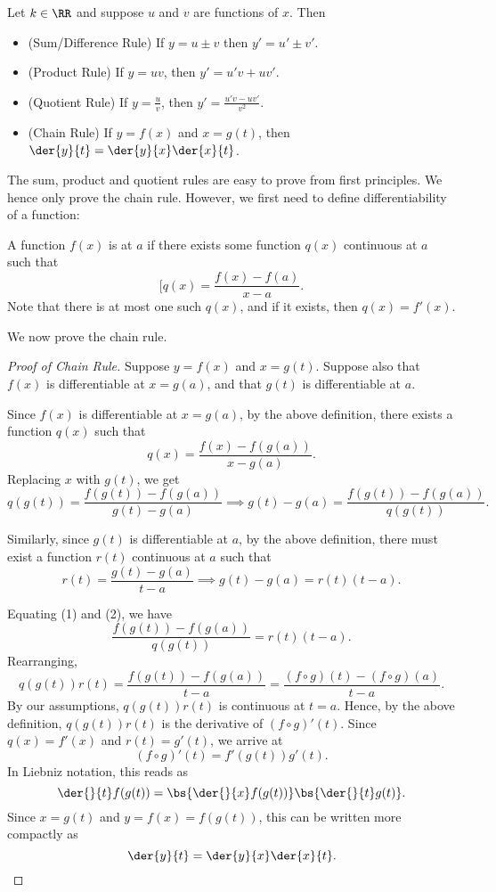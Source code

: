 \begin{proposition}
    Let $k \in \RR$ and suppose $u$ and $v$ are functions of $x$. Then
    \begin{itemize}
        \item (Sum/Difference Rule) If $y = u \pm v$ then $y' = u' \pm v'$.
        \item (Product Rule) If $y = uv$, then $y' = u' v + u v'$.
        \item (Quotient Rule) If $y = \frac{u}{v}$, then $y' = \frac{u' v - u v'}{v^2}$.
        \item (Chain Rule) If $y = f(x)$ and $x = g(t)$, then $\der{y}{t} = \der{y}{x} \der{x}{t}$.
    \end{itemize}
\end{proposition}
The sum, product and quotient rules are easy to prove from first principles. We hence only prove the chain rule. However, we first need to define differentiability of a function:
\begin{definition}\label{def:Differentiability}
    A function $f(x)$ is  at $a$ if there exists some function $q(x)$ continuous at $a$ such that \[[q(x) = \frac{f(x) - f(a)}{x - a}.\] Note that there is at most one such $q(x)$, and if it exists, then $q(x) = f'(x)$.
\end{definition}
We now prove the chain rule.
\begin{proof}[Proof of Chain Rule]    
    Suppose $y = f(x)$ and $x = g(t)$. Suppose also that $f(x)$ is differentiable at $x = g(a)$, and that $g(t)$ is differentiable at $a$.

    Since $f(x)$ is differentiable at $x = g(a)$, by the above definition, there exists a function $q(x)$ such that \[q(x) = \frac{f(x) - f(g(a))}{x - g(a)}.\] Replacing $x$ with $g(t)$, we get \[q(g(t)) = \frac{f(g(t)) - f(g(a))}{g(t) - g(a)} \implies g(t) - g(a) = \frac{f(g(t)) - f(g(a))}{q(g(t))}. \tag{1}\]

    Similarly, since $g(t)$ is differentiable at $a$, by the above definition, there must exist a function $r(t)$ continuous at $a$ such that \[r(t) = \frac{g(t) - g(a)}{t - a} \implies g(t) - g(a) = r(t) (t - a). \tag{2}\]

    Equating (1) and (2), we have \[\frac{f(g(t)) - f(g(a))}{q(g(t))} = r(t) (t - a).\] Rearranging, \[q(g(t)) r(t) = \frac{f(g(t)) - f(g(a))}{t - a} = \frac{(f \circ g)(t) - (f \circ g)(a)}{t - a}.\] By our assumptions, $q(g(t)) r(t)$ is continuous at $t = a$. Hence, by the above definition, $q(g(t)) r(t)$ is the derivative of $(f \circ g)'(t)$. Since $q(x) = f'(x)$ and $r(t) = g'(t)$, we arrive at \[(f \circ g)'(t) = f'(g(t)) g'(t).\] In Liebniz notation, this reads as \[\der{}{t} f(g(t)) = \bs{\der{}{x} f(g(t))} \bs{\der{}{t} g(t)}.\] Since $x = g(t)$ and $y = f(x) = f(g(t))$, this can be written more compactly as \[\der{y}{t} = \der{y}{x} \der{x}{t}.\]
\end{proof}

